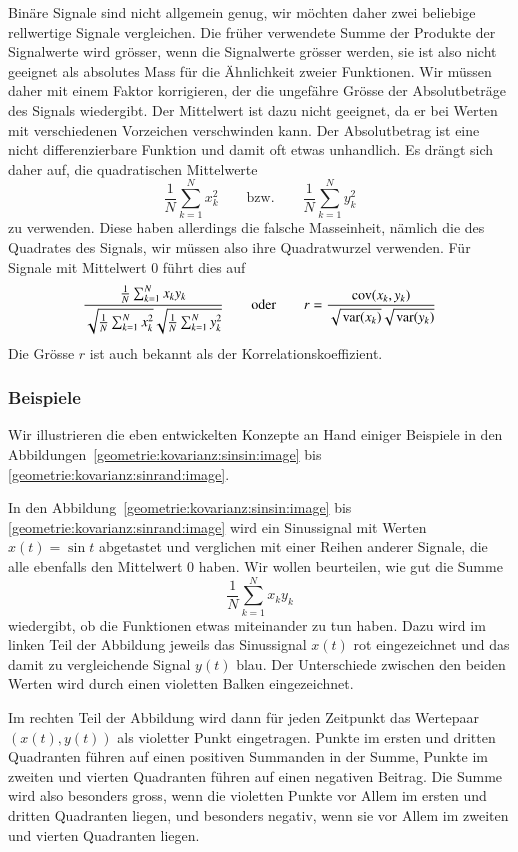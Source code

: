Binäre Signale sind nicht allgemein genug, wir möchten daher zwei
beliebige rellwertige Signale vergleichen.
Die früher verwendete Summe der Produkte der Signalwerte wird grösser,
wenn die Signalwerte grösser werden, sie ist also nicht geeignet als
absolutes Mass für die Ähnlichkeit zweier Funktionen.
Wir müssen daher mit einem Faktor korrigieren, der die ungefähre
Grösse der Absolutbeträge des Signals wiedergibt.
Der Mittelwert ist dazu nicht geeignet, da er bei Werten mit verschiedenen
Vorzeichen verschwinden kann.
Der Absolutbetrag ist eine nicht differenzierbare Funktion und damit
oft etwas unhandlich.
Es drängt sich daher auf, die quadratischen Mittelwerte
\[
\frac1{N}
\sum_{k=1}^N x_k^2
\qquad\text{bzw.}\qquad
\frac1{N}
\sum_{k=1}^N y_k^2
\]
zu
verwenden.
Diese haben allerdings die falsche Masseinheit, nämlich die des
Quadrates des Signals, wir müssen also ihre Quadratwurzel verwenden.
Für Signale mit Mittelwert $0$ führt dies auf
\[
\frac{
\frac{1}{N}\sum_{k=1}^N x_ky_k
}{
\sqrt{\frac{1}{N}\sum_{k=1}^N x_k^2}
\sqrt{\frac{1}{N}\sum_{k=1}^N y_k^2}
}
\qquad\text{oder}\qquad
r
=
\frac{\operatorname{cov}(x_k,y_k)}{\sqrt{\mathstrut\vphantom{y_k}\operatorname{var}(x_k)}\sqrt{\mathstrut\operatorname{var}(y_k)}}
\]
Die Grösse $r$ ist auch bekannt als der Korrelationskoeffizient.
%
%

\subsubsection{Beispiele}
Wir illustrieren die eben entwickelten Konzepte an Hand einiger Beispiele
in den Abbildungen~\ref{geometrie:kovarianz:sinsin:image} bis
\ref{geometrie:kovarianz:sinrand:image}.

In den Abbildung~\ref{geometrie:kovarianz:sinsin:image} bis
\ref{geometrie:kovarianz:sinrand:image} wird ein Sinussignal
mit Werten $x(t)=\sin t$ abgetastet und verglichen mit
einer Reihen anderer Signale,
die alle ebenfalls den Mittelwert $0$ haben.
Wir wollen beurteilen, wie gut die Summe
\[
\frac{1}{N}\sum_{k=1}^N x_ky_k
\]
wiedergibt, ob die Funktionen etwas miteinander zu tun haben.
Dazu wird im linken Teil der Abbildung jeweils das Sinussignal
$x(t)$ rot eingezeichnet und das damit zu vergleichende Signal $y(t)$
blau.
Der Unterschiede zwischen den beiden Werten wird durch einen 
violetten Balken eingezeichnet.

Im rechten Teil der Abbildung wird dann für jeden Zeitpunkt
das Wertepaar $(x(t),y(t))$ als violetter Punkt eingetragen.
Punkte im ersten und dritten Quadranten führen auf einen positiven
Summanden in der Summe, Punkte im zweiten und vierten Quadranten
führen auf einen negativen Beitrag.
Die Summe wird also besonders gross, wenn die violetten Punkte vor
Allem im ersten und dritten Quadranten liegen, und besonders negativ,
wenn sie vor Allem im zweiten und vierten Quadranten liegen.

